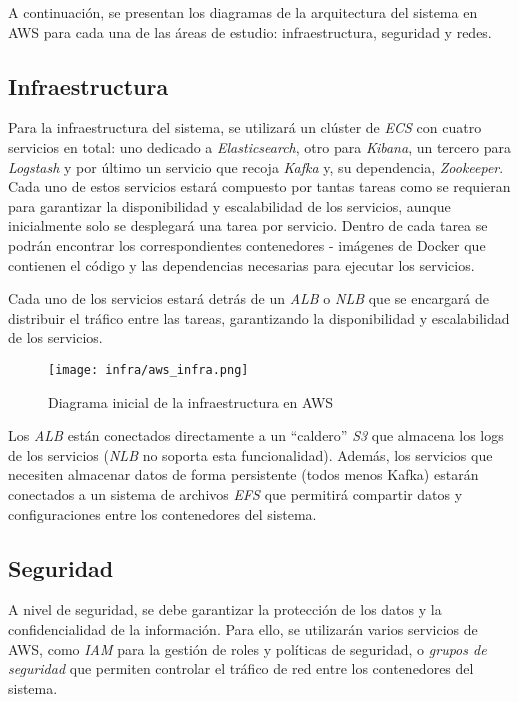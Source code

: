 A continuación, se presentan los diagramas de la arquitectura del sistema en AWS
para cada una de las áreas de estudio: infraestructura, seguridad y redes.


\newpage{}
\subsection{Infraestructura}
Para la infraestructura del sistema, se utilizará un clúster de \textit{ECS} con
cuatro servicios en total: uno dedicado a \textit{Elasticsearch}, otro para
\textit{Kibana}, un tercero para \textit{Logstash} y por último un servicio que
recoja \textit{Kafka} y, su dependencia, \textit{Zookeeper}. Cada uno de estos
servicios estará compuesto por tantas tareas como se requieran para garantizar
la disponibilidad y escalabilidad de los servicios, aunque inicialmente solo se
desplegará una tarea por servicio. Dentro de cada tarea se podrán encontrar los
correspondientes contenedores - imágenes de Docker que contienen el código y las
dependencias necesarias para ejecutar los servicios.

Cada uno de los servicios estará detrás de un \textit{ALB} o \textit{NLB} que se
encargará de distribuir el tráfico entre las tareas, garantizando la
disponibilidad y escalabilidad de los servicios.

\begin{figure}[H]
	\centerline{\texttt{[image: infra/aws\_infra.png]}}
	\caption{Diagrama inicial de la infraestructura en AWS}
	\label{fig:aws_infra}
\end{figure}

Los \textit{ALB} están conectados directamente a un ``caldero'' \textit{S3} que
almacena los logs de los servicios (\textit{NLB} no soporta esta funcionalidad).
Además, los servicios que necesiten almacenar datos de forma persistente (todos
menos Kafka) estarán conectados a un sistema de archivos \textit{EFS} que
permitirá compartir datos y configuraciones entre los contenedores del sistema.


\subsection{Seguridad}
A nivel de seguridad, se debe garantizar la protección de los datos y la
confidencialidad de la información. Para ello, se utilizarán varios servicios de
AWS, como \textit{IAM} para la gestión de roles y políticas de seguridad, o
\textit{grupos de seguridad} que permiten controlar el tráfico de red entre los
contenedores del sistema.

